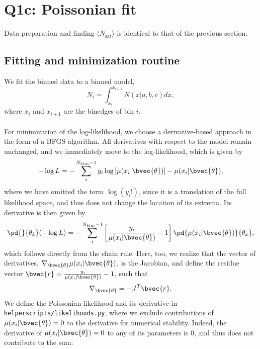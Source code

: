 \section{Q1c: Poissonian fit}
Data preparation and finding $\langle N_\text{sat}\rangle$ is identical to that of the previous section.
\subsection{Fitting and minimization routine}
We fit the binned data to a binned model,
\begin{equation}
    N_i = \int_{x_i}^{x_{i+1}} N(x| a, b, c) dx,
    \label{eq:binned_model}
\end{equation}
where $x_i$ and $x_{i+1}$ are the binedges of bin $i$. \\
\\
For minimization of the log-likelihood, we choose a derivative-based approach in the form of a BFGS algorithm. All derivatives with respect to the model remain unchanged, and we immediately move to the log-likelihood, which is given by
\begin{equation}
    -\log L = -\sum_i^{N_\text{bins}-1}y_i\log\left[\mu(x_i|\bvec{\theta})\right] - \mu(x_i|\bvec{\theta}),
\end{equation}
where we have omitted the term $\log\left(y_i!\right)$, since it is a translation of the full likelihood space, and thus does not change the location of its extrema.
Its derivative is then given by
\begin{equation}
    \pd{}{\theta_k}(-\log L) = -\sum_{i}^{N_\text{bins}-1}\left[\frac{y_i}{\mu(x_i|\bvec{\theta})}-1\right]\pd{\mu(x_i|\bvec{\theta})}{\theta_x},
\end{equation}
which follows directly from the chain rule. Here, too, we realize that the vector of derivatives, $\nabla_{\bvec{\theta}}\mu(x_i|\bvec{\theta})$, is the Jacobian, and define the residue vector $\bvec{r} = \frac{y_i}{\mu(x_i|\bvec{\theta})} - 1$, such that
\begin{equation}
    \nabla_{\bvec{\theta}} = -J^T\bvec{r}.
\end{equation}
We define the Poissonian likelihood and its derivative in \verb|helperscripts/likelihoods.py|, where we exclude contributions of $\mu(x_i|\bvec{\theta})=0$ to the derivative for numerical stability. Indeed, the derivative of $\mu(x_i|\bvec{\theta})=0$ to any of its parameters is 0, and thus does not contribute to the sum:

